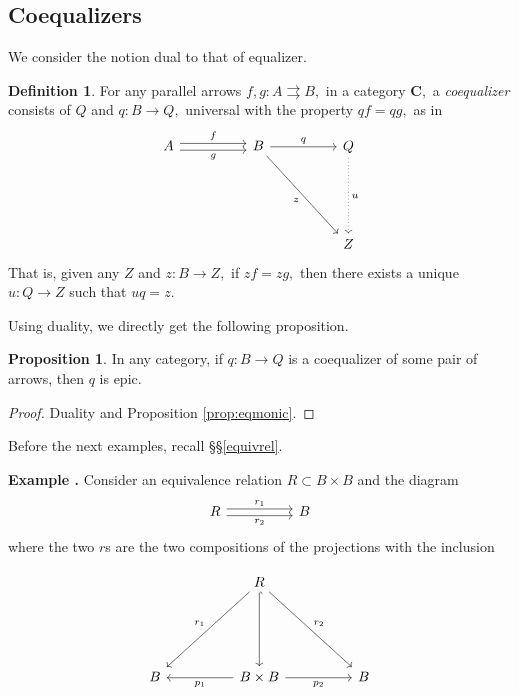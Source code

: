 \documentclass[11pt,leqno,landscape,semhelv]{seminar}
\theoremstyle{definition}
\newtheorem{prop}[thm]{Proposition}
\newtheorem{defn}[thm]{Definition}
\numberwithin{joke}{section}
\numberwithin{thm}{section}
\numberwithin{equation}{section}
\newcommand{\example}[1]{\refstepcounter{thm}\par\medskip
   {\textbf{Example \thethm.} #1} \rmfamily}
\newcommand{\tto}{\rightrightarrows}
\begin{document}
\subsection{Coequalizers} \label{ssec:coeq}
We consider the notion dual to that of equalizer.
\begin{defn} 
  For any parallel arrows $f, g:A \tto B,$ in a category $\mathbf{C},$ a \emph{coequalizer} consists of $Q$ and $q:B \to Q,$ universal with the property $qf = qg,$ as in
  \begin{equation*} 
    \begin{tikzcd}
    A \arrow[rr, "g"', shift right] \arrow[rr, "f", shift left] && 
    B \arrow[rr, "q"] \arrow[rrddd, "z"'] &  & Q \arrow[ddd, "u", dotted] \\
    &&&&\\&&&&\\
    &&&& Z
    \end{tikzcd}
  \end{equation*}
  That is, given any $Z$ and $z:B\to Z,$ if $zf = zg,$ then there exists a unique $u:Q \to Z$ such that $uq = z.$
\end{defn}
Using duality, we directly get the following proposition.
\begin{prop}
  In any category, if $q:B\to Q$ is a coequalizer of some pair of arrows, then $q$ is epic.
\end{prop}
\begin{proof} 
  Duality and Proposition \ref{prop:eqmonic}.
\end{proof}
Before the next examples, recall \S\S\ref{equivrel}.
\example{} Consider an equivalence relation $R \subset B \times B$ and the diagram
\begin{equation*} 
  \begin{tikzcd}
    R \arrow[rr, "r_1", shift left] \arrow[rr, "r_2"', shift right] && B
  \end{tikzcd}
\end{equation*}
where the two $r$s are the two compositions of the projections with the inclusion

\begin{equation*} 
  \begin{tikzcd}
  && R \arrow[ddd, hook] \arrow[llddd, "r_1"'] \arrow[rrddd, "r_2"] &&\\
  &&&&\\&&&&\\
  B && B \times B \arrow[ll, "p_1"] \arrow[rr, "p_2"'] && B
  \end{tikzcd}
\end{equation*} 
\end{document}
